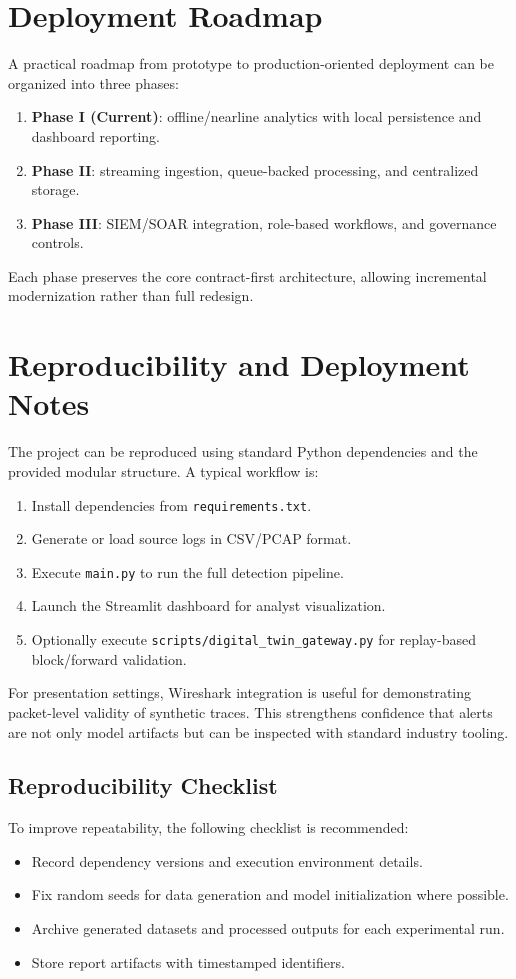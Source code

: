 \documentclass[conference]{IEEEtran}
\begin{document}
\section{Deployment Roadmap}
A practical roadmap from prototype to production-oriented deployment can be organized into three phases:
\begin{enumerate}
    \item \textbf{Phase I (Current)}: offline/nearline analytics with local persistence and dashboard reporting.
    \item \textbf{Phase II}: streaming ingestion, queue-backed processing, and centralized storage.
    \item \textbf{Phase III}: SIEM/SOAR integration, role-based workflows, and governance controls.
\end{enumerate}

Each phase preserves the core contract-first architecture, allowing incremental modernization rather than full redesign.

\section{Reproducibility and Deployment Notes}
The project can be reproduced using standard Python dependencies and the provided modular structure. A typical workflow is:
\begin{enumerate}
    \item Install dependencies from \texttt{requirements.txt}.
    \item Generate or load source logs in CSV/PCAP format.
    \item Execute \texttt{main.py} to run the full detection pipeline.
    \item Launch the Streamlit dashboard for analyst visualization.
    \item Optionally execute \texttt{scripts/digital\_twin\_gateway.py} for replay-based block/forward validation.
\end{enumerate}

For presentation settings, Wireshark integration is useful for demonstrating packet-level validity of synthetic traces. This strengthens confidence that alerts are not only model artifacts but can be inspected with standard industry tooling.

\subsection{Reproducibility Checklist}
To improve repeatability, the following checklist is recommended:
\begin{itemize}
    \item Record dependency versions and execution environment details.
    \item Fix random seeds for data generation and model initialization where possible.
    \item Archive generated datasets and processed outputs for each experimental run.
    \item Store report artifacts with timestamped identifiers.
\end{itemize}
\end{document}
